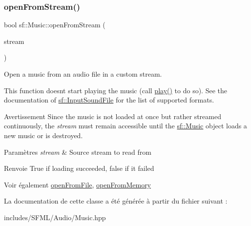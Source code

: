 \subsubsection{\texorpdfstring{open\+From\+Stream()}{openFromStream()}}
{\footnotesize\ttfamily bool sf\+::\+Music\+::open\+From\+Stream (\begin{DoxyParamCaption}\item[{\hyperlink{classsf_1_1InputStream}{Input\+Stream} \&}]{stream }\end{DoxyParamCaption})}



Open a music from an audio file in a custom stream. 

This function doesn\textquotesingle{}t start playing the music (call \hyperlink{classsf_1_1SoundStream_afdc08b69cab5f243d9324940a85a1144}{play()} to do so). See the documentation of \hyperlink{classsf_1_1InputSoundFile}{sf\+::\+Input\+Sound\+File} for the list of supported formats.

\begin{DoxyWarning}{Avertissement}
Since the music is not loaded at once but rather streamed continuously, the {\itshape stream} must remain accessible until the \hyperlink{classsf_1_1Music}{sf\+::\+Music} object loads a new music or is destroyed.
\end{DoxyWarning}

\begin{DoxyParams}{Paramètres}
{\em stream} & Source stream to read from\\
\hline
\end{DoxyParams}
\begin{DoxyReturn}{Renvoie}
True if loading succeeded, false if it failed
\end{DoxyReturn}
\begin{DoxySeeAlso}{Voir également}
\hyperlink{classsf_1_1Music_a3edc66e5f5b3f11e84b90eaec9c7d7c0}{open\+From\+File}, \hyperlink{classsf_1_1Music_ae93b21bcf28ff0b5fec458039111386e}{open\+From\+Memory} 
\end{DoxySeeAlso}


La documentation de cette classe a été générée à partir du fichier suivant \+:\begin{DoxyCompactItemize}
\item 
includes/\+S\+F\+M\+L/\+Audio/Music.\+hpp\end{DoxyCompactItemize}
